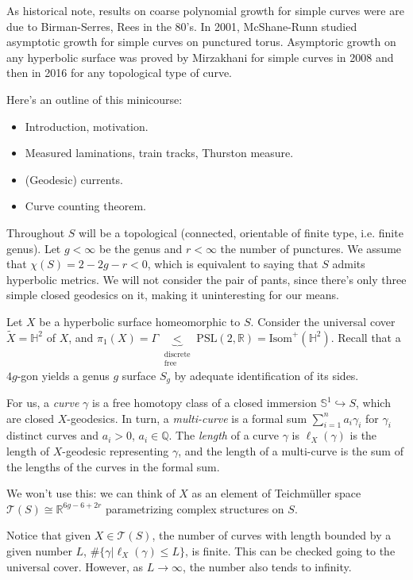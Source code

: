 As historical note,
results on coarse polynomial growth for
simple curves
were are due to Birman-Serres, Rees in the
80's.
In 2001, McShane-Runn studied asymptotic
growth
for simple curves on punctured torus.
Asymptoric growth on any hyperbolic
surface was proved by Mirzakhani for simple
curves in 2008
and then in 2016 for any topological type of
curve.

Here's an outline of this minicourse:
\begin{itemize}
\item Introduction, motivation.
\item Measured laminations, train tracks,
Thurston measure.
\item  (Geodesic) currents.
\item Curve counting theorem.
\end{itemize}

\medskip\noindent
Throughout $S$ will be a topological
(connected, orientable
of finite type, i.e. finite genus). Let
$g<\infty$ be the genus
and $r< \infty$ the number of punctures.
We assume that $\chi(S)=2-2g-r<0$,
which is equivalent to saying that $S$
admits hyperbolic metrics.
We will not consider the pair of pants,
since there's only three simple closed
geodesics on it,
making it uninteresting for our means.

Let $X$ be a hyperbolic surface homeomorphic
to $S$.
Consider the universal cover
$\tilde{X}=\mathbb{H}^2$ of $X$,
and
$\pi_1(X)=\Gamma\underbrace{<}
_{\substack{\text{discrete}
\\ \text{free}}}
\text{PSL}(2,\mathbb{R})=\text{Isom}^+
(\mathbb{H}^2)$.
Recall that a $4g$-gon yields a genus $g$
surface $S_g$ by
adequate identification of its sides.

For us, a {\it curve} $\gamma$ is a free
homotopy class
of a closed immersion $\mathbb{S}^1
\hookrightarrow S$,
which are closed $X$-geodesics.
In turn, a {\it multi-curve}
is a formal sum $\sum_{i=1}^na_i\gamma_i$
for $\gamma_i$ distinct curves and $a_i>0$,
$a_i \in \mathbb{Q}$.
The {\it length} of a curve $\gamma$ is
$\ell_X(\gamma)$ is the length of
$X$-geodesic representing $\gamma$,
and the length of a multi-curve is the sum of
the lengths
of the curves in the formal sum.

We won't use this: we can think of $X$ as
an element of Teichmüller space
$\mathcal{T}(S)\cong \mathbb{R}^{6g-6+2r}$
parametrizing complex structures on $S$.

\medskip\noindent
Notice that given $X \in\mathcal{T}(S)$,
the number of curves with length bounded by a
given number $L$,
$\#\{\gamma|\ell_X(\gamma)\leq L\}$,
is finite. This can be checked going to the
universal cover.
However, as $L \to \infty$, the number also
tends to infinity.

